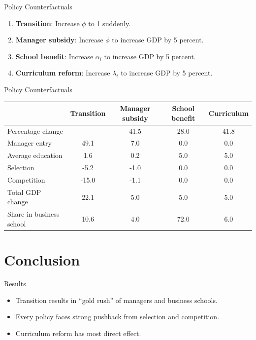 \documentclass[
  ignorenonframetext,
  aspectratio=1610,
]{beamer}
\providecommand{\tightlist}{%
  \setlength{\itemsep}{0pt}\setlength{\parskip}{0pt}}
\begin{document}
\begin{frame}{Policy Counterfactuals}
\protect\hypertarget{policy-counterfactuals}{}
\begin{enumerate}
\tightlist
\item
  \textbf{Transition}: Increase \(\phi\) to 1 suddenly.
\item
  \textbf{Manager subsidy}: Increase \(\phi\) to increase GDP by 5
  percent.
\item
  \textbf{School benefit}: Increase \(\alpha_i\) to increase GDP by 5
  percent.
\item
  \textbf{Curriculum reform}: Increase \(\lambda_i\) to increase GDP by
  5 percent.
\end{enumerate}
\end{frame}

\begin{frame}{Policy Counterfactuals}
\protect\hypertarget{policy-counterfactuals-1}{}
\begin{tabular}{lcccc}
\toprule
{} & Transition & Manager subsidy & School benefit & Curriculum \\
\midrule
Percentage change        &                &        41.5 &       28.0 &           41.8 \\
Manager entry            &           49.1 &         7.0 &         0.0 &            0.0 \\
Average education        &            1.6 &         0.2 &         5.0 &            5.0 \\
Selection                &           -5.2 &        -1.0 &         0.0 &            0.0 \\
Competition              &          -15.0 &        -1.1 &         0.0 &            0.0 \\
\midrule
Total GDP change         &           22.1 &         5.0 &         5.0 &            5.0 \\
\midrule
Share in business school &          10.6 &       4.0 &       72.0 &          6.0 \\
\bottomrule
\end{tabular}
\end{frame}

\section{Conclusion}\label{conclusion}

\begin{frame}{Results}
\protect\hypertarget{results}{}
\begin{itemize}
\tightlist
\item
  Transition results in ``gold rush'' of managers and business schools.
\item
  Every policy faces strong pushback from selection and competition.
\item
  Curriculum reform has most direct effect.
\end{itemize}
\end{frame}
\end{document}
